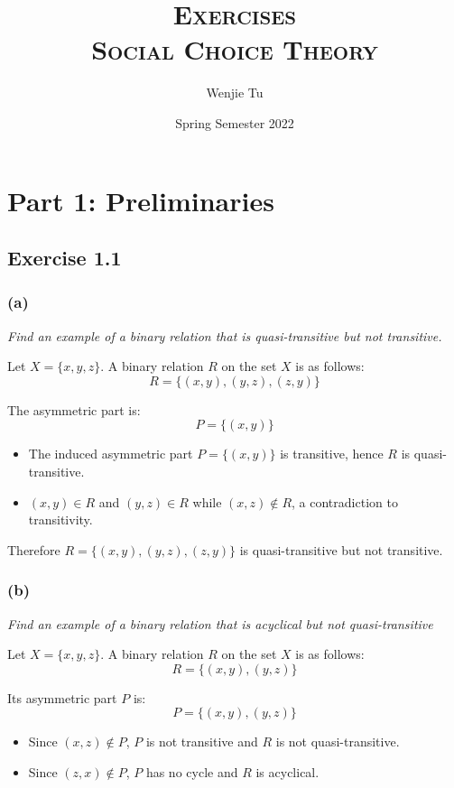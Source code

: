\documentclass[a4paper]{article}
\title{%
    \textsc{Exercises} \\
    \vspace{1mm}
    \large \textsc{Social Choice Theory}
}
\author{Wenjie Tu}
\date{Spring Semester 2022}
\begin{document}
\maketitle

\section*{Part 1: Preliminaries}

\subsection*{Exercise 1.1}

\subsubsection*{(a)} 

\textit{Find an example of a binary relation that is quasi-transitive but not transitive.}

Let $X=\{x, y, z\}$. A binary relation $R$ on the set $X$ is as follows:
\[R=\{(x,y), (y,z), (z,y) \} \]

The asymmetric part is:
\[P=\{(x,y)\} \]

\begin{itemize}
    \item The induced asymmetric part $P=\{(x,y)\}$ is transitive, hence $R$ is quasi-transitive.
    \item $(x,y)\in R$ and $(y,z)\in R$ while $(x,z)\notin R$, a contradiction to transitivity.
\end{itemize}

Therefore $R=\{(x,y), (y,z), (z,y) \}$ is quasi-transitive but not transitive.

\subsubsection*{(b)}

\textit{Find an example of a binary relation that is acyclical but not quasi-transitive}

Let $X=\{x, y, z\}$. A binary relation $R$ on the set $X$ is as follows:
\[R=\{(x,y), (y,z) \} \]

Its asymmetric part $P$ is:
\[P=\{(x,y), (y,z) \} \]

\begin{itemize}
    \item Since $(x,z)\notin P$, $P$ is not transitive and $R$ is not quasi-transitive.
    \item Since $(z,x)\notin P$, $P$ has no cycle and $R$ is acyclical.
\end{itemize}
\end{document}
